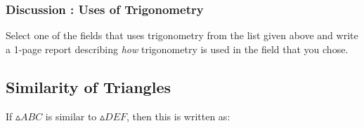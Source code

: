             \subsubsection{  Discussion : Uses of Trigonometry }
            \nopagebreak
            
      \label{m39405*id78126}Select one of the fields that uses trigonometry from the list given above and write a 1-page report describing \textsl{how} trigonometry is used in the field that you chose. \par 

    
    \label{m39405*cid4}
            \subsection{ Similarity of Triangles}
            \nopagebreak
            
      
      \label{m39405*id78153}If \begin{math}▵ABC\end{math} is similar to \begin{math}▵DEF\end{math}, then this is written as:\par 
      \label{m39405*id78186}\nopagebreak\noindent{}
    
